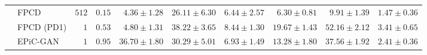 \begin{tabular}{llrrrrrrrc}
        & FPCD              & $512$ & $0.15$          & $4.36 \pm 1.28$                     & $26.11 \pm 6.30$                               & $6.44 \pm 2.57$                     & $6.30 \pm 0.81$                               & $9.91 \pm 1.39$                               & $1.47 \pm 0.36$                           \\
        & FPCD (PD1)        & $1$   & $0.53$          & $4.80 \pm 1.31$                     & $38.22 \pm 3.65$                               & $8.44 \pm 1.30$                     & $19.67 \pm 1.43$                              & $52.16 \pm 2.12$                              & $3.41 \pm 0.65$                           \\
        & EPiC-GAN          & $1$   & $0.95$          & $36.70 \pm 1.80$                    & $30.29 \pm 5.01$                               & $6.93 \pm 1.49$                     & $13.28 \pm 1.80$                              & $37.56 \pm 1.92$                              & $2.41 \pm 0.36$                           \\
    \midrule


\end{tabular}
